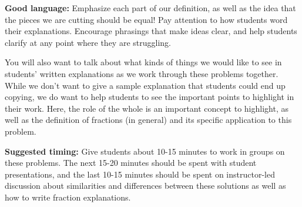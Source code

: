 \documentclass[nooutcomes,noauthor]{ximera}
\begin{document}
\begin{instructorNotes}
{\bf Good language:}  Emphasize each part of our definition, as well as the idea that the pieces we are cutting should be equal! Pay attention to how students word their explanations. Encourage phrasings that make ideas clear, and help students clarify at any point where they are struggling. 

You will also want to talk about what kinds of things we would like to see in students' written explanations as we work through these problems together. While we don't want to give a sample explanation that students could end up copying, we do want to help students to see the important points to highlight in their work. Here, the role of the whole is an important concept to highlight, as well as the definition of fractions (in general) and its specific application to this problem.




{\bf Suggested timing:} Give students about 10-15 minutes to work in groups on these problems. The next 15-20 minutes should be spent with student presentations, and the last 10-15 minutes should be spent on instructor-led discussion about similarities and differences between these solutions as well as how to write fraction explanations.




\end{instructorNotes}
\end{document}
